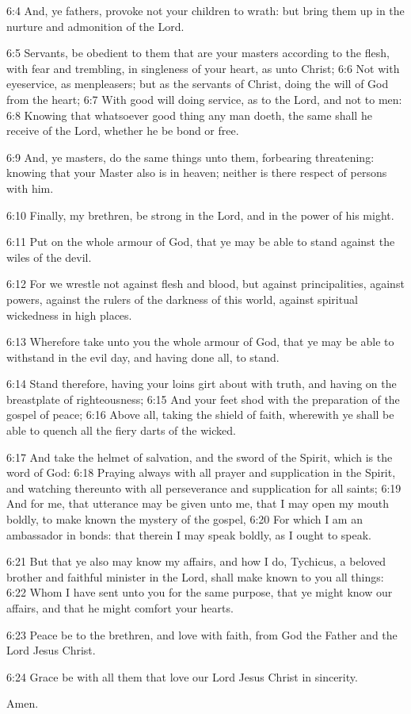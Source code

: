 6:4 And, ye fathers, provoke not your children to wrath: but bring
them up in the nurture and admonition of the Lord.

6:5 Servants, be obedient to them that are your masters according to
the flesh, with fear and trembling, in singleness of your heart, as
unto Christ; 6:6 Not with eyeservice, as menpleasers; but as the
servants of Christ, doing the will of God from the heart; 6:7 With
good will doing service, as to the Lord, and not to men: 6:8 Knowing
that whatsoever good thing any man doeth, the same shall he receive of
the Lord, whether he be bond or free.

6:9 And, ye masters, do the same things unto them, forbearing
threatening: knowing that your Master also is in heaven; neither is
there respect of persons with him.

6:10 Finally, my brethren, be strong in the Lord, and in the power of
his might.

6:11 Put on the whole armour of God, that ye may be able to stand
against the wiles of the devil.

6:12 For we wrestle not against flesh and blood, but against
principalities, against powers, against the rulers of the darkness of
this world, against spiritual wickedness in high places.

6:13 Wherefore take unto you the whole armour of God, that ye may be
able to withstand in the evil day, and having done all, to stand.

6:14 Stand therefore, having your loins girt about with truth, and
having on the breastplate of righteousness; 6:15 And your feet shod
with the preparation of the gospel of peace; 6:16 Above all, taking
the shield of faith, wherewith ye shall be able to quench all the
fiery darts of the wicked.

6:17 And take the helmet of salvation, and the sword of the Spirit,
which is the word of God: 6:18 Praying always with all prayer and
supplication in the Spirit, and watching thereunto with all
perseverance and supplication for all saints; 6:19 And for me, that
utterance may be given unto me, that I may open my mouth boldly, to
make known the mystery of the gospel, 6:20 For which I am an
ambassador in bonds: that therein I may speak boldly, as I ought to
speak.

6:21 But that ye also may know my affairs, and how I do, Tychicus, a
beloved brother and faithful minister in the Lord, shall make known to
you all things: 6:22 Whom I have sent unto you for the same purpose,
that ye might know our affairs, and that he might comfort your hearts.

6:23 Peace be to the brethren, and love with faith, from God the
Father and the Lord Jesus Christ.

6:24 Grace be with all them that love our Lord Jesus Christ in
sincerity.

Amen.

